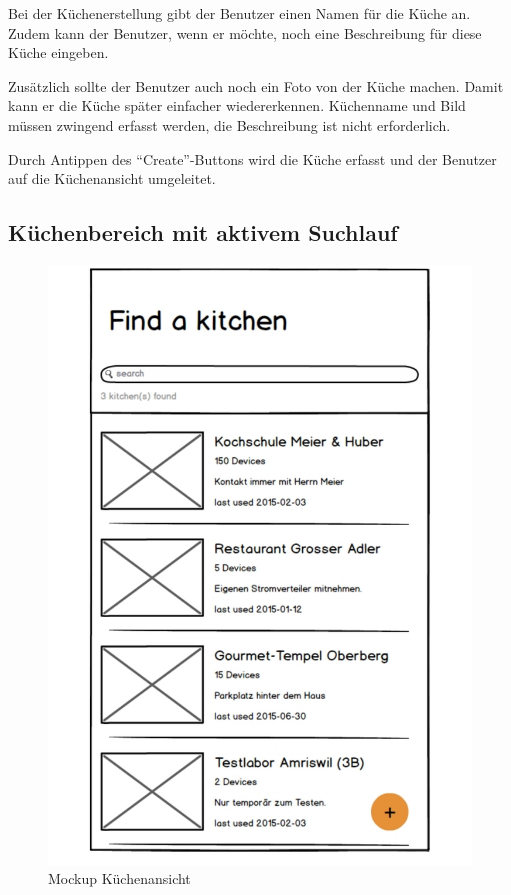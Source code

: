 Bei der Küchenerstellung gibt der Benutzer einen Namen für die Küche an. Zudem kann der Benutzer, wenn er möchte, noch eine Beschreibung für diese Küche eingeben.

Zusätzlich sollte der Benutzer auch noch ein Foto von der Küche machen. Damit kann er die Küche später einfacher wiedererkennen. Küchenname und Bild müssen zwingend erfasst werden, die Beschreibung ist nicht erforderlich.

Durch Antippen des \enquote{Create}-Buttons wird die Küche erfasst und der Benutzer auf die Küchenansicht umgeleitet.

\WFclear

\subsection{Küchenbereich mit aktivem Suchlauf}
\label{subsec:Küchenbereich mit aktivem Suchlauf}

\begin{figure}
	\includegraphics[page=4,trim=0 0 0 0,clip,scale=0.21]{uiux/res/mockups}
	\caption{Mockup Küchenansicht}
    \label{abb:mockKitchenView}
\end{figure}

